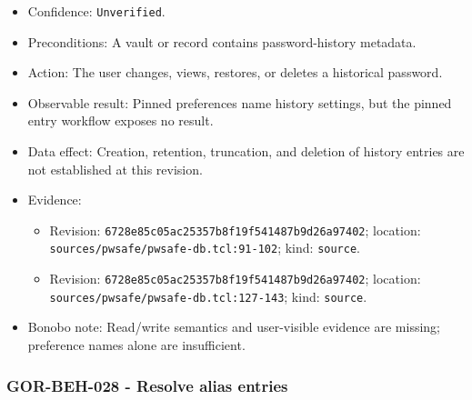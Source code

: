 \documentclass[
  letterpaper,
]{article}
\newcommand{\passthrough}[1]{#1}
\providecommand{\tightlist}{%
  \setlength{\itemsep}{0pt}\setlength{\parskip}{0pt}}
\begin{document}
\begin{itemize}
\tightlist
\item
  Confidence: \nolinkurl{Unverified}.
\item
  Preconditions: A vault or record contains password-history metadata.
\item
  Action: The user changes, views, restores, or deletes a historical password.
\item
  Observable result: Pinned preferences name history settings, but the pinned entry workflow exposes no result.
\item
  Data effect: Creation, retention, truncation, and deletion of history entries are not established at this revision.
\item
  Evidence:

  \begin{itemize}
  \tightlist
  \item
    Revision: \nolinkurl{6728e85c05ac25357b8f19f541487b9d26a97402}; location:
    \nolinkurl{sources/pwsafe/pwsafe-db.tcl:91-102}; kind: \passthrough{\lstinline!source!}.
  \item
    Revision: \nolinkurl{6728e85c05ac25357b8f19f541487b9d26a97402}; location:
    \nolinkurl{sources/pwsafe/pwsafe-db.tcl:127-143}; kind: \passthrough{\lstinline!source!}.
  \end{itemize}
\item
  Bonobo note: Read/write semantics and user-visible evidence are missing; preference names alone are insufficient.
\end{itemize}

\subsubsection{GOR-BEH-028 - Resolve alias entries}\label{gor-beh-028---resolve-alias-entries}
\end{document}

